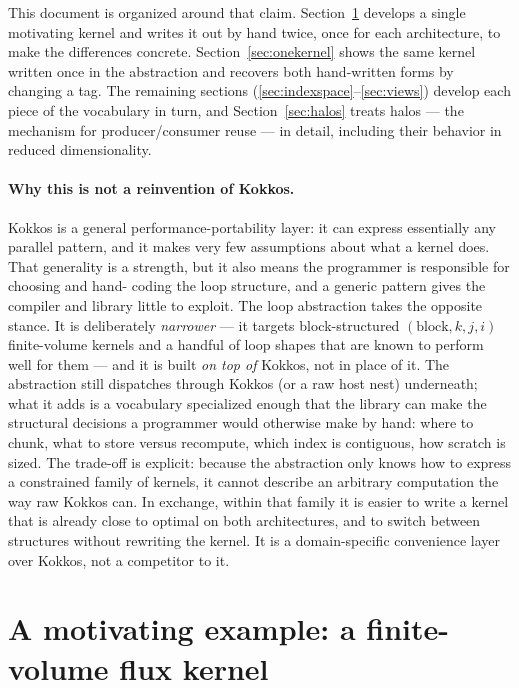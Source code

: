 \documentclass[11pt]{article}
\begin{document}
This document is organized around that claim. Section~\ref{sec:motivation}
develops a single motivating kernel and writes it out by hand twice, once for each
architecture, to make the differences concrete. Section~\ref{sec:onekernel} shows
the same kernel written once in the abstraction and recovers both hand-written
forms by changing a tag. The remaining sections
(\ref{sec:indexspace}--\ref{sec:views}) develop each piece of the vocabulary in
turn, and Section~\ref{sec:halos} treats halos --- the mechanism for
producer/consumer reuse --- in detail, including their behavior in reduced
dimensionality.

\paragraph{Why this is not a reinvention of Kokkos.} Kokkos is a general
performance-portability layer: it can express essentially any parallel pattern,
and it makes very few assumptions about what a kernel does. That generality is a
strength, but it also means the programmer is responsible for choosing and hand-
coding the loop structure, and a generic pattern gives the compiler and library
little to exploit. The loop abstraction takes the opposite stance. It is
deliberately \emph{narrower} --- it targets block-structured
$(\text{block}, k, j, i)$ finite-volume kernels and a handful of loop shapes that
are known to perform well for them --- and it is built \emph{on top of} Kokkos,
not in place of it. The abstraction still dispatches through Kokkos (or a raw host
nest) underneath; what it adds is a vocabulary specialized enough that the library
can make the structural decisions a programmer would otherwise make by hand:
where to chunk, what to store versus recompute, which index is contiguous, how
scratch is sized. The trade-off is explicit: because the abstraction only knows
how to express a constrained family of kernels, it cannot describe an arbitrary
computation the way raw Kokkos can. In exchange, within that family it is easier
to write a kernel that is already close to optimal on both architectures, and to
switch between structures without rewriting the kernel. It is a domain-specific
convenience layer over Kokkos, not a competitor to it.

\section{A motivating example: a finite-volume flux kernel}
\label{sec:motivation}
\end{document}
